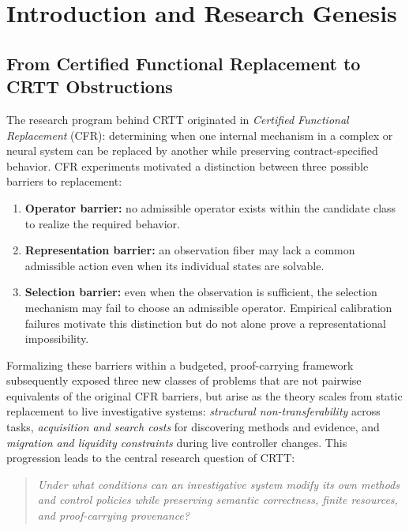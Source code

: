 \documentclass[10pt,letterpaper]{article}
\begin{document}
\section{Introduction and Research Genesis}
\label{sec:intro}

\subsection{From Certified Functional Replacement to CRTT Obstructions}
The research program behind CRTT originated in \emph{Certified Functional Replacement} (CFR): determining when one internal mechanism in a complex or neural system can be replaced by another while preserving contract-specified behavior. CFR experiments motivated a distinction between three possible barriers to replacement:
\begin{enumerate}
    \item \textbf{Operator barrier:} no admissible operator exists within the candidate class to realize the required behavior.
    \item \textbf{Representation barrier:} an observation fiber may lack a common admissible action even when its individual states are solvable.
    \item \textbf{Selection barrier:} even when the observation is sufficient, the selection mechanism may fail to choose an admissible operator. Empirical calibration failures motivate this distinction but do not alone prove a representational impossibility.
\end{enumerate}

Formalizing these barriers within a budgeted, proof-carrying framework subsequently exposed three new classes of problems that are not pairwise equivalents of the original CFR barriers, but arise as the theory scales from static replacement to live investigative systems: \emph{structural non-transferability} across tasks, \emph{acquisition and search costs} for discovering methods and evidence, and \emph{migration and liquidity constraints} during live controller changes. This progression leads to the central research question of CRTT:
\begin{quote}
\emph{Under what conditions can an investigative system modify its own methods and control policies while preserving semantic correctness, finite resources, and proof-carrying provenance?}
\end{quote}
\end{document}
